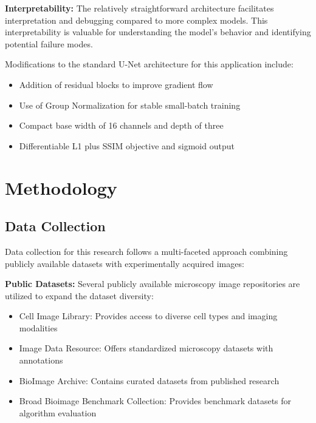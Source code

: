 \documentclass[12pt,a4paper]{report}
\begin{document}
\vspace{0.5cm}

\textbf{Interpretability:} The relatively straightforward architecture facilitates interpretation and debugging compared to more complex models. This interpretability is valuable for understanding the model's behavior and identifying potential failure modes.

\vspace{0.5cm}

Modifications to the standard U-Net architecture for this application include:
\begin{itemize}
    \item Addition of residual blocks to improve gradient flow
    \item Use of Group Normalization for stable small-batch training
    \item Compact base width of 16 channels and depth of three
    \item Differentiable L1 plus SSIM objective and sigmoid output
\end{itemize}

\chapter{Methodology}
\label{chap:methodology}

\section{Data Collection}

Data collection for this research follows a multi-faceted approach combining publicly available datasets with experimentally acquired images:

\vspace{0.5cm}

\textbf{Public Datasets:} Several publicly available microscopy image repositories are utilized to expand the dataset diversity:
\begin{itemize}
    \item Cell Image Library: Provides access to diverse cell types and imaging modalities
    \item Image Data Resource: Offers standardized microscopy datasets with annotations
    \item BioImage Archive: Contains curated datasets from published research
    \item Broad Bioimage Benchmark Collection: Provides benchmark datasets for algorithm evaluation
\end{itemize}
\end{document}

